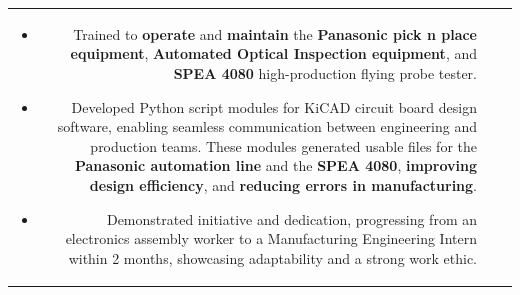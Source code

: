 \documentclass[allblack]{simplehipstercv}
\begin{document}
\begin{paracol}{2}
\begin{tabular}{r| p{} c}
{\begin{itemize}
            \item Trained to \textbf{operate} and \textbf{maintain} the \textbf{Panasonic pick n place equipment}, \textbf{Automated Optical Inspection equipment}, and \textbf{SPEA 4080} high-production flying probe tester. 
            \item Developed Python script modules for KiCAD circuit board design software, enabling seamless communication between engineering and production teams. 
            These modules generated usable files for the \textbf{Panasonic automation line} and the \textbf{SPEA 4080}, \textbf{improving design efficiency}, and \textbf{reducing errors in manufacturing}.
            \item Demonstrated initiative and dedication, progressing from an electronics assembly worker to a Manufacturing Engineering Intern within 2 months, 
            showcasing adaptability and a strong work ethic. 
        \end{itemize}
    }
\end{tabular}
\newpage

\end{paracol}
\end{document}
